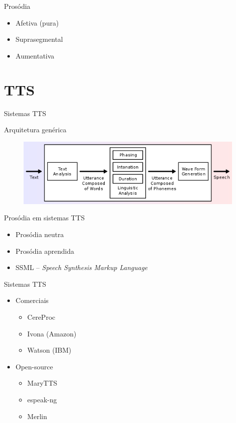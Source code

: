 \documentclass{beamer}
\begin{document}
\begin{frame}{Prosódia}
  \begin{itemize}
    \item Afetiva (pura)
    \item Suprasegmental
    \item Aumentativa
  \end{itemize}
\end{frame}

\section{TTS}
\begin{frame}{Sistemas TTS}
  \begin{block}{Arquitetura genérica}
    \begin{figure}
      \includegraphics[scale=0.55]{tts-system.png}
    \end{figure}
  \end{block}
\end{frame}

\begin{frame}{Prosódia em sistemas TTS}
  \begin{itemize}
    \item Prosódia neutra
    \item Prosódia aprendida
    \item SSML -- \emph{Speech Synthesis Markup Language}
  \end{itemize}
\end{frame}

\begin{frame}{Sistemas TTS}
  \begin{itemize}
    \item Comerciais
      \begin{itemize}
        \item CereProc
        \item Ivona (Amazon)
        \item Watson (IBM)
      \end{itemize}
    \item Open-source
      \begin{itemize}
        \item MaryTTS
        \item espeak-ng
        \item Merlin
      \end{itemize}
  \end{itemize}
\end{frame}
\end{document}
